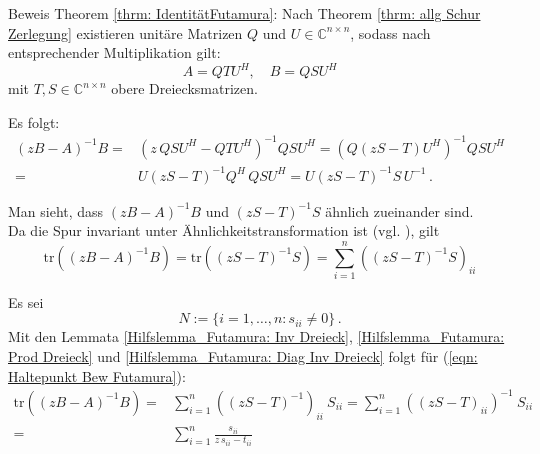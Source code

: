 \documentclass[a4paper,12pt]{report}
\newcommand{\C}{\mathbb C}
\newcommand{\tr}{\text{tr}}
\newcommand{\Cnn}{\C^{n\times n}}
\newcommand{\inv}{^{-1}}
\newcommand{\1}{\mathds{1}}
\theoremstyle{plain} %
\theoremstyle{definition} %
\theoremstyle{remark}
\begin{document}
            Beweis Theorem \ref{thrm: IdentitätFutamura}:
            Nach Theorem \ref{thrm: allg Schur Zerlegung} existieren unitäre Matrizen $Q$ und $U\in\Cnn$, sodass nach entsprechender Multiplikation gilt:
            $$A=QTU^H,\quad B=QSU^H$$
            mit $T,S\in\Cnn$ obere Dreiecksmatrizen.
            

            Es folgt:
            \begin{align*}
                  (zB-A)\inv B =& (z\,QSU^H-QTU^H)\inv QSU^H = (Q(zS-T)U^H)\inv QSU^H \\
                  =& U(zS-T)\inv Q^H\,QSU^H = U(zS-T)\inv S\,U\inv\,.
            \end{align*}

            Man sieht, dass $(zB-A)\inv B$ und  $(zS-T)\inv S$ ähnlich zueinander sind.\\
            Da die Spur invariant unter Ähnlichkeitstransformation ist (vgl. \cite[Exercise unter Example 1.3.5]{matrixSpur}), gilt
            \begin{equation}
                  \label{eqn: Haltepunkt Bew Futamura}
                  \tr((zB-A)\inv B) = \tr((zS-T)\inv S) = \sum_{i=1}^{n}((zS-T)\inv S)_{ii}
            \end{equation}

            Es sei $$N:=\{i=1,\dots,n: s_{ii}\ne 0\}\,.$$
            Mit den Lemmata \ref{Hilfslemma_Futamura: Inv Dreieck}, \ref{Hilfslemma_Futamura: Prod Dreieck} und
            \ref{Hilfslemma_Futamura: Diag Inv Dreieck} folgt für (\ref{eqn: Haltepunkt Bew Futamura}):
            \begin{align*}
                  \tr((zB-A)\inv B) =& \sum_{i=1}^{n}((zS-T)\inv)_{ii}\ S_{ii} = \sum_{i=1}^{n}((zS-T)_{ii})\inv\ S_{ii}\\
                  =& \sum_{i=1}^{n}\frac{s_{ii}}{z\,s_{ii}-t_{ii}}
            \end{align*}
\end{document}
